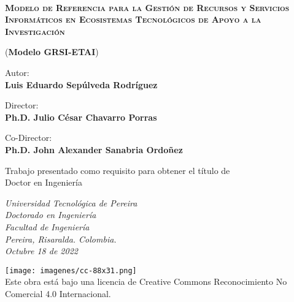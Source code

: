 

\newpage
~\vfill
\thispagestyle{empty}

\begin{center}
	\large\textbf{\textsc{Modelo de Referencia para la Gestión de Recursos y Servicios Informáticos en Ecosistemas Tecnológicos de Apoyo a la Investigación}} \\
    \vspace{0.2cm}

	(\textbf{Modelo GRSI-ETAI}) \\ \vspace{1.3cm}

	Autor:\\
	\textbf{Luis Eduardo Sepúlveda Rodríguez} \vspace{1cm}

	Director:\\
	\textbf{Ph.D. Julio César Chavarro Porras} \\ \vspace{1cm}

	Co-Director:\\
	\textbf{Ph.D. John Alexander Sanabria Ordoñez} \\ \vspace{1.3cm}

	Trabajo presentado como requisito para obtener el título de\\ Doctor en Ingeniería \\
    \vspace{1.5cm}

	\textit{
		Universidad Tecnológica de Pereira\\
		Doctorado en Ingeniería \\
		Facultad de Ingeniería\\
		Pereira, Risaralda. Colombia. \\
		Octubre 18 de 2022} \\ \vspace{1cm}
\end{center}

\texttt{[image: imagenes/cc-88x31.png]} \\
\noindent Este obra está bajo una licencia de Creative Commons Reconocimiento No Comercial 4.0 Internacional.\\
